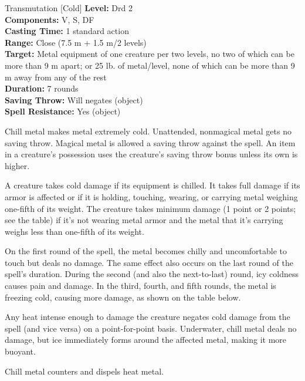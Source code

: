 {Transmutation [Cold]}
{
	\textbf{Level:}
	Drd 2\\
	\textbf{Components:}
	V, S, DF\\
	\textbf{Casting Time:}
	1 standard action\\
	\textbf{Range:}
	Close (7.5 m + 1.5 m/2 levels)\\
	\textbf{Target:}
	Metal equipment of one creature per two levels, no two of which can be more than 9 m apart; or 25 lb. of metal/level, none of which can be more than 9 m away from any of the rest\\
	\textbf{Duration:}
	7 rounds\\
	\textbf{Saving Throw:}
	Will negates (object)\\
	\textbf{Spell Resistance:}
	Yes (object)\\
}
{
	Chill metal makes metal extremely cold. Unattended, nonmagical metal gets no saving throw. Magical metal is allowed a saving throw against the spell. An item in a creature's possession uses the creature's saving throw bonus unless its own is higher.

	A creature takes cold damage if its equipment is chilled. It takes full damage if its armor is affected or if it is holding, touching, wearing, or carrying metal weighing one-fifth of its weight. The creature takes minimum damage (1 point or 2 points; see the table) if it's not wearing metal armor and the metal that it's carrying weighs less than one-fifth of its weight.

	On the first round of the spell, the metal becomes chilly and uncomfortable to touch but deals no damage. The same effect also occurs on the last round of the spell's duration. During the second (and also the next-to-last) round, icy coldness causes pain and damage. In the third, fourth, and fifth rounds, the metal is freezing cold, causing more damage, as shown on the table below.

	Any heat intense enough to damage the creature negates cold damage from the spell (and vice versa) on a point-for-point basis. Underwater, chill metal deals no damage, but ice immediately forms around the affected metal, making it more buoyant.

	Chill metal counters and dispels heat metal.

}
